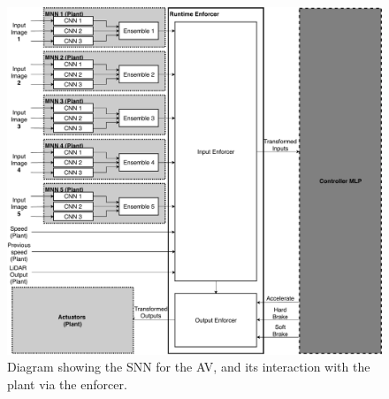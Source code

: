 \begin{figure}[H]
	\centering
	\includegraphics[width=\textwidth]{Content/fig/AV-MNN.pdf}
	\caption{Diagram showing the \ac{SNN} for the \ac{AV}, and its interaction with the plant via the enforcer. \label{fig:avmnn}}
\end{figure}




